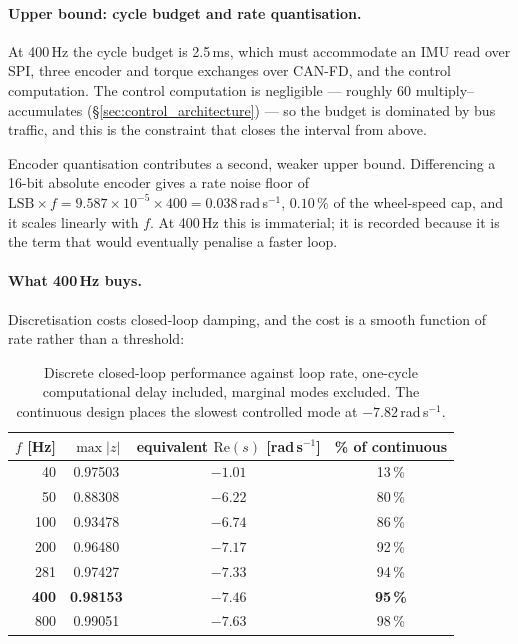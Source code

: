 \paragraph{Upper bound: cycle budget and rate quantisation.} At 400\,Hz the
cycle budget is 2.5\,ms, which must accommodate an IMU read over SPI, three
encoder and torque exchanges over CAN-FD, and the control computation. The
control computation is negligible --- roughly 60 multiply--accumulates
(\S\ref{sec:control_architecture}) --- so the budget is dominated by bus traffic, and
this is the constraint that closes the interval from above.

Encoder quantisation contributes a second, weaker upper bound. Differencing a
16-bit absolute encoder gives a rate noise floor of
$\mathrm{LSB}\times f = 9.587\times10^{-5}\times400 = 0.038$\,rad\,s$^{-1}$,
$0.10\,\%$ of the wheel-speed cap, and it scales linearly with $f$. At
400\,Hz this is immaterial; it is recorded because it is the term that would
eventually penalise a faster loop.

\paragraph{What 400\,Hz buys.} Discretisation costs closed-loop damping, and
the cost is a smooth function of rate rather than a threshold:

\begin{table}[htbp]
\centering
\small
\begin{tabular}{@{}rccc@{}}
\toprule
$f$ [Hz] & $\max|z|$ & equivalent $\mathrm{Re}(s)$ [rad\,s$^{-1}$] &
  \% of continuous\\
\midrule
 40 & 0.97503 & $-1.01$ & 13\,\%\\
 50 & 0.88308 & $-6.22$ & 80\,\%\\
100 & 0.93478 & $-6.74$ & 86\,\%\\
200 & 0.96480 & $-7.17$ & 92\,\%\\
281 & 0.97427 & $-7.33$ & 94\,\%\\
\textbf{400} & \textbf{0.98153} & $\bm{-7.46}$ & \textbf{95\,\%}\\
800 & 0.99051 & $-7.63$ & 98\,\%\\
\bottomrule
\end{tabular}
\caption{Discrete closed-loop performance against loop rate, one-cycle
computational delay included, marginal modes excluded. The continuous design
places the slowest controlled mode at $-7.82$\,rad\,s$^{-1}$.}
\label{tab:loop-rate}
\end{table}

